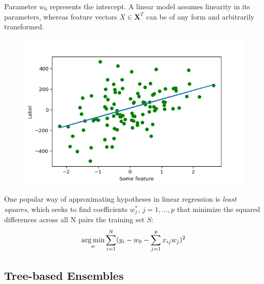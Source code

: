 Parameter $ w_0 $ represents the intercept. A linear model assumes linearity in its parameters, whereas feature vectors $ X \in \textbf{X}^{T} $ can be of any form and arbitrarily transformed. 

\begin{figure}
	\centering
	\includegraphics[width=0.7\linewidth]{../Implementation/Plots/linear_reg_example.png}
	\caption{}
	\label{fig:linearreg}
\end{figure}
One popular way of approximating hypotheses in linear regression is \textit{least squares}, which seeks to find coefficients $ w^{*}_j $, $ j = 1, \dots, p $ that minimize the squared differences across all N pairs the training set $ S $:
\begin{equation}
\operatorname*{arg\,min}_{w} \sum_{i=1}^{N}(y_i - w_0 - \sum_{j=1}^{p} x_{ij}w_j)^2 
\end{equation}

\subsection{Tree-based Ensembles}

